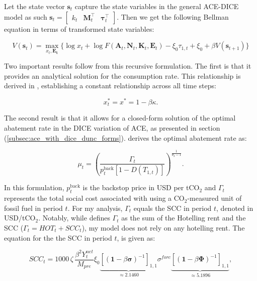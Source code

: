 Let the state vector \(\bm{s}_t\) capture the state variables in the general ACE-DICE model as such \(\bm{s}_t = \begin{bmatrix} k_t & \bm{M}_t^\top & \bm{\tau}_t^\top \end{bmatrix}\). Then we get the following Bellman equation in terms of transformed state variables:

\begin{equation}
    V(\bm{s}_t) = \max_{x_t, \bm{E_t}} \Bigg\{ \log x_t 
        + \log F(\bm{A}_t,\bm{N}_t,\bm{K}_t,\bm{E}_t)
        - \xi_0\tau_{1,t} + \xi_0
        + \beta V(\bm{s}_{t+1}) \Bigg \}
\label{eq:bellman_equation_tranformed_states}
\end{equation}

Two important results follow from this recursive formulation. The first is that it provides an analytical solution for the consumption rate. This relationship is derived in \textcite{TraegerChristian2023ACE}, establishing a constant relationship across all time steps:

\begin{equation}
    x_t^* = x^*= 1 - \beta\kappa.
\label{eq:analytical_x_t}
\end{equation}

The second result is that it allows for a closed-form solution of the optimal abatement rate in the DICE variation of ACE, as presented in section (\ref{subsec:ace_with_dice_dunc_forms}). \textcite{traeger2021analytic_discussion} derives the optimal abatement rate as:

\begin{equation}
    \mu_t = \left( \frac{\Gamma_t}{p_t^\text{back}[1-D(T_{1,t})]} \right)^{\frac{1}{\theta_2 - 1}} .
\label{eq:analytical_abatement_rate}
\end{equation}

In this formulation, \(p_t^\text{back}\) is the backstop price in USD per tCO$_2$ and $\Gamma_t$ represents the total social cost associated with using a CO$_2$-measured unit of fossil fuel in period \(t\). For my analysis, $\Gamma_t$ equals the SCC in period \(t\), denoted in USD/tCO$_2$. Notably, while \textcite{traeger2021analytic_discussion} defines $\Gamma_t$ as the sum of the Hotelling rent and the SCC ($\Gamma_t = HOT_t + SCC_t$), my model does not rely on any hotelling rent. The equation for the the SCC in period \(t\), is given as:

\begin{equation}
    SCC_t = 1000\,\zeta\,\frac{\beta^2 Y_t^{net}}{M_{pre}} \xi_0 \underbrace{[(\bm{1}-\beta\bm{\sigma})^{-1}]_{1,1}}_{\approx 2.1460} \sigma^{forc}\underbrace{[(\bm{1}-\beta\bm{\Phi})^{-1}]_{1,1}}_{\approx 5.1896},
\label{eq:analytical_scc}
\end{equation}

